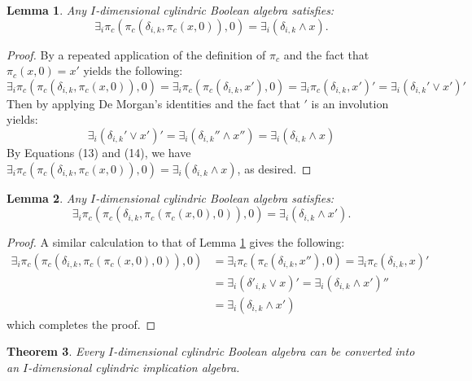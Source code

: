 \documentclass[reqno]{amsart}
\theoremstyle{plain}
\newtheorem{theorem}{Theorem}[section]
\newtheorem{lemma}[theorem]{Lemma}
\theoremstyle{definition}
\begin{document}
\begin{lemma}\label{lemma 3.20}
Any $I$-dimensional cylindric Boolean algebra satisfies: \[\exists_i\pi_c(\pi_c(\delta_{i,k},\pi_c(x,0)),0)=\exists_i(\delta_{i,k}\wedge x).\] 
\end{lemma}
\begin{proof}
By a repeated application of the definition of $\pi_c$ and the fact that $\pi_c(x,0)=x'$ yields the following:  \begin{equation}
\exists_i\pi_c(\pi_c(\delta_{i,k},\pi_c(x,0)),0)=\exists_i\pi_c(\pi_c(\delta_{i,k},x'),0)=\exists_i\pi_c(\delta_{i,k},x')'=\exists_i(\delta_{i,k}'\vee x')'
\end{equation}
Then by applying De Morgan's identities and the fact that $'$ is an involution yields: 
\begin{equation}
    \exists_i(\delta_{i,k}'\vee x')'=\exists_i(\delta_{i,k}''\wedge x'')=\exists_i(\delta_{i,k}\wedge x)
\end{equation}
 By Equations (13) and (14), we have $\exists_i\pi_c(\pi_c(\delta_{i,k},\pi_c(x,0)),0)=\exists_i(\delta_{i,k}\wedge x)$, as desired.  
\end{proof}
\begin{lemma}\label{lemma 3.21}
Any $I$-dimensional cylindric Boolean algebra satisfies: \[\exists_i\pi_c(\pi_c(\delta_{i,k},\pi_c(\pi_c(x,0),0)),0)=\exists_i(\delta_{i,k}\wedge x').\]  
\end{lemma}
\begin{proof}
    A similar calculation to that of Lemma \ref{lemma 3.20} gives the following:
\begin{align*}
    \exists_i\pi_c(\pi_c(\delta_{i,k},\pi_c(\pi_c(x,0),0)),0)&=\exists_i\pi_c(\pi_c(\delta_{i,k},x''),0)=\exists_i\pi_c(\delta_{i,k},x)'\\&=\exists_i(\delta'_{i,k}\vee x)'=\exists_i(\delta_{i,k}\wedge x')''\\&=\exists_i(\delta_{i,k}\wedge x')
\end{align*}
       which completes the proof. 
\end{proof}
\begin{theorem}\label{cba to cia}
    Every $I$-dimensional cylindric Boolean algebra can be converted into an $I$-dimensional cylindric implication algebra. 
\end{theorem}
\end{document}

